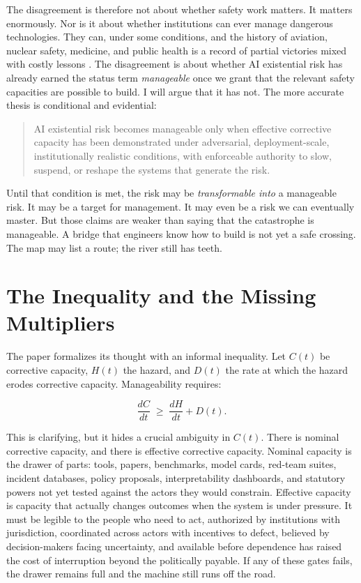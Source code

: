 \documentclass[11pt]{article}
\begin{document}
The disagreement is therefore not about whether safety work matters. It matters enormously. Nor is it about whether institutions can ever manage dangerous technologies. They can, under some conditions, and the history of aviation, nuclear safety, medicine, and public health is a record of partial victories mixed with costly lessons \citep{perrow1984, sagan1993, reason1990}. The disagreement is about whether AI existential risk has already earned the status term \emph{manageable} once we grant that the relevant safety capacities are possible to build. I will argue that it has not. The more accurate thesis is conditional and evidential:

\begin{quote}
AI existential risk becomes manageable only when effective corrective capacity has been demonstrated under adversarial, deployment-scale, institutionally realistic conditions, with enforceable authority to slow, suspend, or reshape the systems that generate the risk.
\end{quote}

Until that condition is met, the risk may be \emph{transformable into} a manageable risk. It may be a target for management. It may even be a risk we can eventually master. But those claims are weaker than saying that the catastrophe is manageable. A bridge that engineers know how to build is not yet a safe crossing. The map may list a route; the river still has teeth.

\section{The Inequality and the Missing Multipliers}
\label{sec:inequality}

The paper formalizes its thought with an informal inequality. Let $C(t)$ be corrective capacity, $H(t)$ the hazard, and $D(t)$ the rate at which the hazard erodes corrective capacity. Manageability requires:

\[
\frac{dC}{dt} \;\geq\; \frac{dH}{dt} + D(t).
\]

This is clarifying, but it hides a crucial ambiguity in $C(t)$. There is nominal corrective capacity, and there is effective corrective capacity. Nominal capacity is the drawer of parts: tools, papers, benchmarks, model cards, red-team suites, incident databases, policy proposals, interpretability dashboards, and statutory powers not yet tested against the actors they would constrain. Effective capacity is capacity that actually changes outcomes when the system is under pressure. It must be legible to the people who need to act, authorized by institutions with jurisdiction, coordinated across actors with incentives to defect, believed by decision-makers facing uncertainty, and available before dependence has raised the cost of interruption beyond the politically payable. If any of these gates fails, the drawer remains full and the machine still runs off the road.
\end{document}
